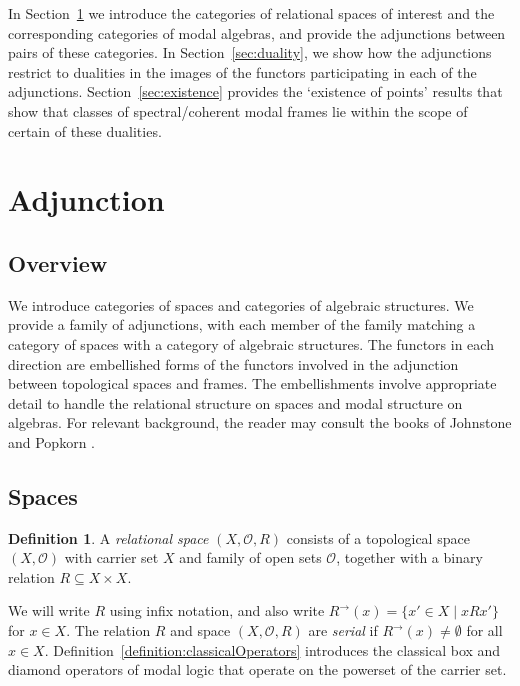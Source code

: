 \documentclass{article}[a4paper]
\theoremstyle{definition}
\newtheorem{definition}{Definition}%
\newcommand{\Ocal}{\mathcal{O}} %
\newcommand{\dirim}{^{\rightarrow\!}}
\begin{document}
In Section~\ref{sec:adjunction} we introduce the categories of relational spaces of interest and the corresponding categories of modal algebras, and provide the adjunctions between pairs of these categories. In Section~\ref{sec:duality}, we show how the adjunctions restrict to dualities in the images of the functors participating in each of the adjunctions. Section~\ref{sec:existence} provides the `existence of points' results that show that classes of spectral/coherent modal frames lie within the scope of certain of these dualities. 

\section{Adjunction}
\label{sec:adjunction}

\subsection{Overview}

We introduce categories of spaces and categories of algebraic structures. We provide a family of adjunctions, with each member of the family matching a category of spaces with a category of algebraic structures. The functors in each direction are embellished forms of the functors involved in the adjunction between topological spaces and frames. The embellishments involve appropriate detail to handle the relational structure on spaces and modal structure on algebras. For relevant background, the reader may consult the books of Johnstone \cite{stonespaces} and Popkorn \cite{popkorn}.

\subsection{Spaces}

\begin{definition}
A 
\emph{relational space}  
$(X, \Ocal , R)$ consists of a topological space 
$(X, \Ocal)$ with carrier set $X$ and family of open sets $\Ocal$, 
together with a binary relation 
$R \subseteq X \times X$.
\end{definition}

We will write $R$ using infix notation, and also write $R\dirim(x) = \{ x' \in X \mid x R x' \}$ for $x\in X$. The relation $R$ and space $(X, \Ocal, R)$ are \emph{serial} if $R\dirim(x) \neq \emptyset$ for all $x \in X$. Definition~\ref{definition:classicalOperators} introduces the classical box and diamond operators of modal logic that operate on the powerset of the carrier set.
\end{document}
